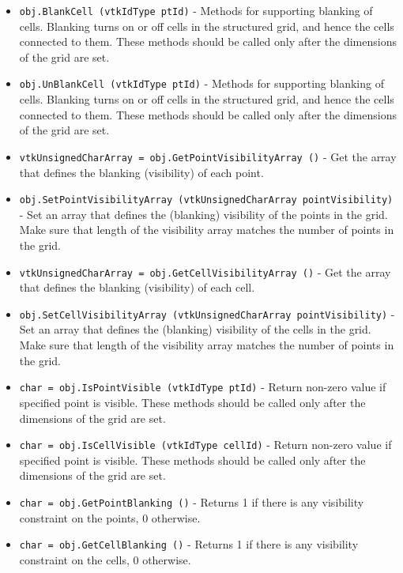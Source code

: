 \begin{itemize}
\item  \verb|obj.BlankCell (vtkIdType ptId)| -  Methods for supporting blanking of cells. Blanking turns on or off
 cells in the structured grid, and hence the cells connected to them.
 These methods should be called only after the dimensions of the
 grid are set.

\item  \verb|obj.UnBlankCell (vtkIdType ptId)| -  Methods for supporting blanking of cells. Blanking turns on or off
 cells in the structured grid, and hence the cells connected to them.
 These methods should be called only after the dimensions of the
 grid are set.

\item  \verb|vtkUnsignedCharArray = obj.GetPointVisibilityArray ()| -  Get the array that defines the blanking (visibility) of each point.

\item  \verb|obj.SetPointVisibilityArray (vtkUnsignedCharArray pointVisibility)| -  Set an array that defines the (blanking) visibility of the points 
 in the grid. Make sure that length of the visibility array matches 
 the number of points in the grid.

\item  \verb|vtkUnsignedCharArray = obj.GetCellVisibilityArray ()| -  Get the array that defines the blanking (visibility) of each cell.

\item  \verb|obj.SetCellVisibilityArray (vtkUnsignedCharArray pointVisibility)| -  Set an array that defines the (blanking) visibility of the cells 
 in the grid. Make sure that length of the visibility array matches 
 the number of points in the grid.

\item  \verb|char = obj.IsPointVisible (vtkIdType ptId)| -  Return non-zero value if specified point is visible.
 These methods should be called only after the dimensions of the
 grid are set.

\item  \verb|char = obj.IsCellVisible (vtkIdType cellId)| -  Return non-zero value if specified point is visible.
 These methods should be called only after the dimensions of the
 grid are set.

\item  \verb|char = obj.GetPointBlanking ()| -  Returns 1 if there is any visibility constraint on the points,
 0 otherwise.

\item  \verb|char = obj.GetCellBlanking ()| -  Returns 1 if there is any visibility constraint on the cells,
 0 otherwise.


\end{itemize}
